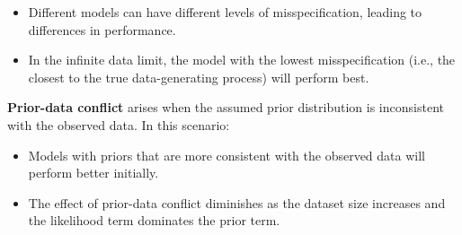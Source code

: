 \documentclass[25pt,a0paper,landscape]{tikzposter}
\begin{document}
\begin{columns}
{\begin{multicols}{2}
\begin{theorybox}[title=Model Misspecification]
\begin{itemize}
          \item Different models can have different levels of misspecification, leading to differences in performance.
          \item In the infinite data limit, the model with the lowest misspecification (i.e., the closest to the true data-generating process) will perform best.
        \end{itemize}
      \end{theorybox}
      \columnbreak
      \begin{theorybox}[title=Prior-Data Conflict]
        \textbf{Prior-data conflict} arises when the assumed prior distribution is inconsistent with the observed data. In this scenario:
        \begin{itemize}
        \item Models with priors that are more consistent with the observed data will perform better initially.
        \item The effect of prior-data conflict diminishes as the dataset size increases and the likelihood term dominates the prior term.
        \end{itemize}
      \end{theorybox}
    \end{multicols}
  }
\end{columns}
\end{document}
